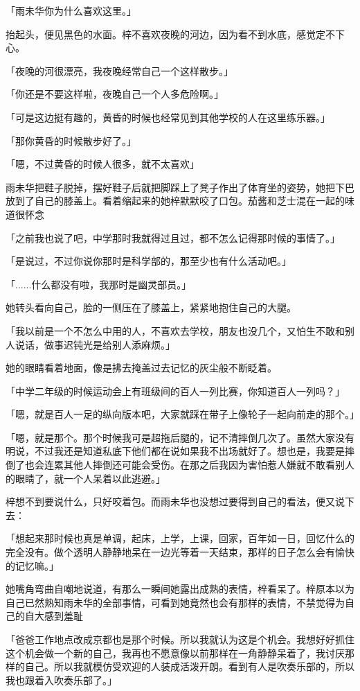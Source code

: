 \documentclass[UTF8]{ctexart}
\begin{document}
    「雨未华你为什么喜欢这里。」

    抬起头，便见黑色的水面。梓不喜欢夜晚的河边，因为看不到水底，感觉定不下心。

    「夜晚的河很漂亮，我夜晚经常自己一个这样散步。」

    「你还是不要这样啦，夜晚自己一个人多危险啊。」

    「可是这边挺有趣的，黄昏的时候也经常见到其他学校的人在这里练乐器。」

    「那你黄昏的时候散步好了。」

    「嗯，不过黄昏的时候人很多，就不太喜欢」

    雨未华把鞋子脱掉，摆好鞋子后就把脚踩上了凳子作出了体育坐的姿势，她把下巴放到了自己的膝盖上。看着缩起来的她梓默默咬了口包。茄酱和芝士混在一起的味道很怀念

    「之前我也说了吧，中学那时我就得过且过，都不怎么记得那时候的事情了。」

    「是说过，不过你说你那时是科学部的，那至少也有什么活动吧。」

    「......什么都没有啦，我那时是幽灵部员。」

    她转头看向自己，脸的一侧压在了膝盖上，紧紧地抱住自己的大腿。

    「我以前是一个不怎么中用的人，不喜欢去学校，朋友也没几个，又怕生不敢和别人说话，做事迟钝光是给别人添麻烦。」

    她的眼睛看着地面，像是拂去掩盖过去记忆的灰尘般不断眨着。

    「中学二年级的时候运动会上有班级间的百人一列比赛，你知道百人一列吗？」

    「嗯，就是百人一足的纵向版本吧，大家就踩在带子上像轮子一起向前走的那个。」

    「嗯，就是那个。那个时候我可是超拖后腿的，记不清摔倒几次了。虽然大家没有明说，不过我还是知道私底下他们都在说如果我不出场就好了。想也是，我要是摔倒了也会连累其他人摔倒还可能会受伤。在那之后我因为害怕惹人嫌就不敢看别人的眼睛了，就一个人呆着以此逃避。」

    梓想不到要说什么，只好咬着包。而雨未华也没想过要得到自己的看法，便又说下去：

    「想起来那时候也真是单调，起床，上学，上课，回家，百年如一日，回忆什么的完全没有。做个透明人静静地呆在一边光等着一天结束，那样的日子怎么会有愉快的记忆嘛。」

    她嘴角弯曲自嘲地说道，有那么一瞬间她露出成熟的表情，梓看呆了。梓原本以为自己已然熟知雨未华的全部事情，可看到她竟然也会有那样的表情，不禁觉得为自己的自大感到羞耻

    「爸爸工作地点改成京都也是那个时候。所以我就认为这是个机会。我想好好抓住这个机会做一个新的自己，我再也不愿意像以前那样在一角静静呆着了，我讨厌那样的自己。所以我就模仿受欢迎的人装成活泼开朗。看到有人是吹奏乐部的，所以我也跟着入吹奏乐部了。」
\end{document}
